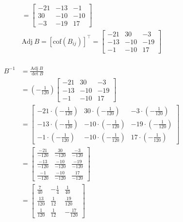 \documentclass[
  letterpaper,
  DIV=11,
  numbers=noendperiod]{scrartcl}
\begin{document}
\begin{align*}
[\mathrm{cof}(B_{ij})] = \begin{bmatrix}
-21 & -13 & -1 \\
30 & -10 & -10 \\
-3 & -19 & 17
\end{bmatrix} \\
\mathrm{Adj} \ B = [\mathrm{cof}(B_{ij})]^\intercal = \begin{bmatrix}
-21 & 30 & -3 \\
-13 & -10 & -19 \\
-1 & -10 & 17
\end{bmatrix} \\
\end{align*}

\newpage{}

\begin{align*}
B^{-1} &= \frac{\mathrm{Adj } \ B}{\det B} \\
&= \left(-\frac{1}{120}\right)\begin{bmatrix}
-21 & 30 & -3 \\
-13 & -10 & -19 \\
-1 & -10 & 17
\end{bmatrix} \\  
&= \begin{bmatrix}
-21 \cdot \left(-\frac{1}{120}\right) & 30 \cdot \left(-\frac{1}{120}\right) & -3 \cdot \left(-\frac{1}{120}\right) \\
-13 \cdot \left(-\frac{1}{120}\right) & -10 \cdot \left(-\frac{1}{120}\right) & -19 \cdot \left(-\frac{1}{120}\right) \\
-1 \cdot \left(-\frac{1}{120}\right) & -10 \cdot \left(-\frac{1}{120}\right) & 17 \cdot \left(-\frac{1}{120}\right)
\end{bmatrix} \\
&= \begin{bmatrix}
\frac{-21}{-120} & \frac{30}{-120} & \frac{-3}{-120} \\
\frac{-13}{-120} & \frac{-10}{-120} & \frac{-19}{-120} \\
\frac{-1}{-120} & \frac{-10}{-120} & \frac{17}{-120}
\end{bmatrix} \\
&= \begin{bmatrix}
\frac{7}{40} & -\frac{1}{4} & \frac{1}{40} \\
\frac{13}{120} & \frac{1}{12} & \frac{19}{120} \\
\frac{1}{120} & \frac{1}{12} & -\frac{17}{120}
\end{bmatrix}
\end{align*}
\end{document}
